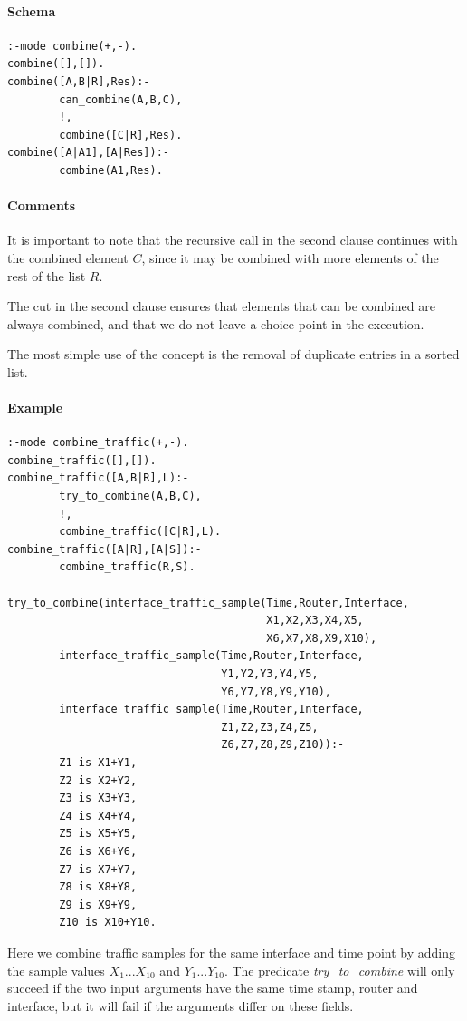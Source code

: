 \documentclass[a4paper,12pt]{report}
\begin{document}
\paragraph{Schema}
\begin{verbatim}
:-mode combine(+,-).
combine([],[]).
combine([A,B|R],Res):-
        can_combine(A,B,C),
        !,
        combine([C|R],Res).
combine([A|A1],[A|Res]):-
        combine(A1,Res).
\end{verbatim}
\paragraph{Comments}
It is important to note that the recursive call in the second clause continues with the combined element $C$, since it may be combined with more elements of the rest of the list $R$.

The cut in the second clause ensures that elements that can be combined are always combined, and that we do not leave a choice point in the execution.

The most simple use of the concept is the removal of duplicate entries in a sorted list.

\pagebreak
\paragraph{Example}
\begin{verbatim}
:-mode combine_traffic(+,-).
combine_traffic([],[]).
combine_traffic([A,B|R],L):-
        try_to_combine(A,B,C),
        !,
        combine_traffic([C|R],L).
combine_traffic([A|R],[A|S]):-
        combine_traffic(R,S).

try_to_combine(interface_traffic_sample(Time,Router,Interface,
                                        X1,X2,X3,X4,X5,
                                        X6,X7,X8,X9,X10),
        interface_traffic_sample(Time,Router,Interface,
                                 Y1,Y2,Y3,Y4,Y5,
                                 Y6,Y7,Y8,Y9,Y10),
        interface_traffic_sample(Time,Router,Interface,
                                 Z1,Z2,Z3,Z4,Z5,
                                 Z6,Z7,Z8,Z9,Z10)):-
        Z1 is X1+Y1,
        Z2 is X2+Y2,
        Z3 is X3+Y3,
        Z4 is X4+Y4,
        Z5 is X5+Y5,
        Z6 is X6+Y6,
        Z7 is X7+Y7,
        Z8 is X8+Y8,
        Z9 is X9+Y9,
        Z10 is X10+Y10.
\end{verbatim}
Here we combine traffic samples for the same interface and time point by adding the sample values $X_{1} ... X_{10}$ and $Y_{1} ... Y_{10}$. The predicate {\it try\_to\_combine} will only succeed if the two input arguments have the same time stamp, router and interface, but it will fail if the arguments differ on these fields. 
\end{document}
